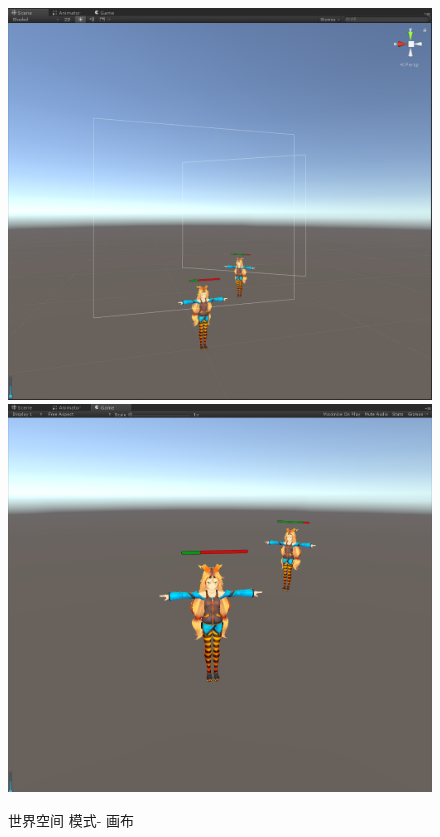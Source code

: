 \documentclass[UTF8,a4paper,12pt]{ctexbook}
\begin{document}
				\begin{figure}[H]
					\centering
					\includegraphics[scale=0.3]{Canvas-2.png}
					\includegraphics[scale=0.3]{Canvas-3.png}
					\caption{世界空间 模式- 画布}
				\end{figure}
			
		
\end{document}
